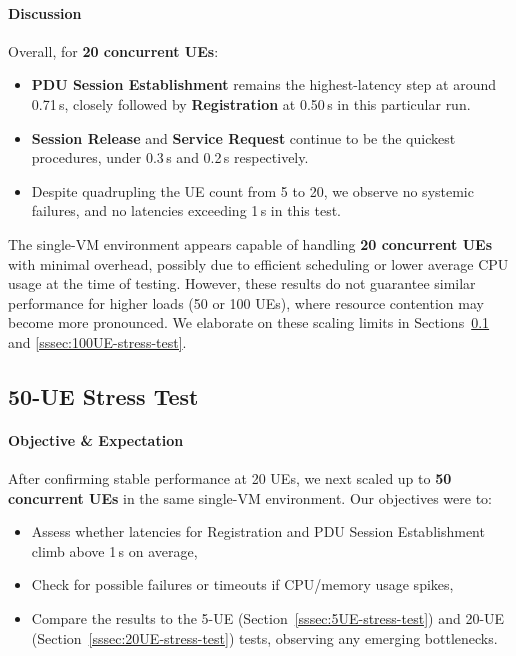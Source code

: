 \paragraph{Discussion}
Overall, for \textbf{20 concurrent UEs}:
\begin{itemize}
    \item \textbf{PDU Session Establishment} remains the highest-latency step at around 0.71\,s, closely followed by \textbf{Registration} at 0.50\,s in this particular run.
    \item \textbf{Session Release} and \textbf{Service Request} continue to be the quickest procedures, under 0.3\,s and 0.2\,s respectively.
    \item Despite quadrupling the UE count from 5 to 20, we observe no systemic failures, and no latencies exceeding 1\,s in this test.
\end{itemize}

The single-VM environment appears capable of handling \textbf{20 concurrent UEs} with minimal overhead, possibly due to efficient scheduling or lower average CPU usage at the time of testing. However, these results do not guarantee similar performance for higher loads (50 or 100 UEs), where resource contention may become more pronounced. We elaborate on these scaling limits in Sections~\ref{sssec:50UE-stress-test} and \ref{sssec:100UE-stress-test}.

\subsection{50-UE Stress Test}
\label{sssec:50UE-stress-test}

\paragraph{Objective \& Expectation}
After confirming stable performance at 20 UEs, we next scaled up to \textbf{50 concurrent UEs} in the same single-VM environment. Our objectives were to:
\begin{itemize}
    \item Assess whether latencies for Registration and PDU Session Establishment climb above 1\,s on average,
    \item Check for possible failures or timeouts if CPU/memory usage spikes,
    \item Compare the results to the 5-UE (Section~\ref{sssec:5UE-stress-test}) and 20-UE (Section~\ref{sssec:20UE-stress-test}) tests, observing any emerging bottlenecks.
\end{itemize}

